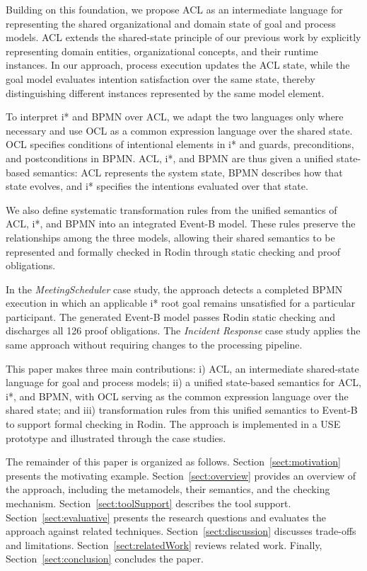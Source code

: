 \documentclass[a4paper, conference]{IEEEtran}
\begin{document}
Building on this foundation, we propose ACL as an intermediate language for representing the shared organizational and domain state of goal and process models. ACL extends the shared-state principle of our previous work by explicitly representing domain entities, organizational concepts, and their runtime instances. In our approach, process execution updates the ACL state, while the goal model evaluates intention satisfaction over the same state, thereby distinguishing different instances represented by the same model element.

To interpret i* and BPMN over ACL, we adapt the two languages only where necessary and use OCL as a common expression language over the shared state. OCL specifies conditions of intentional elements in i* and guards, preconditions, and postconditions in BPMN. ACL, i*, and BPMN are thus given a unified state-based semantics: ACL represents the system state, BPMN describes how that state evolves, and i* specifies the intentions evaluated over that state.

We also define systematic transformation rules from the unified semantics of ACL, i*, and BPMN into an integrated Event-B model. These rules preserve the relationships among the three models, allowing their shared semantics to be represented and formally checked in Rodin through static checking and proof obligations.

In the \textit{MeetingScheduler} case study, the approach detects a completed BPMN execution in which an applicable i* root goal remains unsatisfied for a particular participant. The generated Event-B model passes Rodin static checking and discharges all 126 proof obligations. The \textit{Incident Response} case study applies the same approach without requiring changes to the processing pipeline.

This paper makes three main contributions: i) ACL, an intermediate shared-state language for goal and process models; ii) a unified state-based semantics for ACL, i*, and BPMN, with OCL serving as the common expression language over the shared state; and iii) transformation rules from this unified semantics to Event-B to support formal checking in Rodin. The approach is implemented in a USE prototype and illustrated through the case studies.

The remainder of this paper is organized as follows. Section~\ref{sect:motivation} presents the motivating example. Section~\ref{sect:overview} provides an overview of the approach, including the metamodels, their semantics, and the checking mechanism. Section~\ref{sect:toolSupport} describes the tool support. Section~\ref{sect:evaluative} presents the research questions and evaluates the approach against related techniques. Section~\ref{sect:discussion} discusses trade-offs and limitations. Section~\ref{sect:relatedWork} reviews related work. Finally, Section~\ref{sect:conclusion} concludes the paper.
\end{document}
